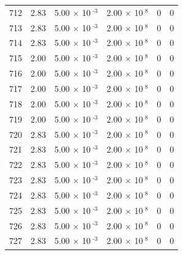 \documentclass[a4paper,11pt]{article}
\begin{document}
\begin{center}
\begin{longtable}{|R{1.5cm}|R{2.4cm}|R{2.4cm}|R{2.4cm}|R{2.4cm}|R{2.4cm}|}
  712 &   2.83  &         5.00 $\times$ 10$^{\text{          -3}}$  &         2.00 $\times$ 10$^{\text{           8}}$  & 0  & 0 \\
  713 &   2.83  &         5.00 $\times$ 10$^{\text{          -3}}$  &         2.00 $\times$ 10$^{\text{           8}}$  & 0  & 0 \\
  714 &   2.83  &         5.00 $\times$ 10$^{\text{          -3}}$  &         2.00 $\times$ 10$^{\text{           8}}$  & 0  & 0 \\
  715 &   2.00  &         5.00 $\times$ 10$^{\text{          -3}}$  &         2.00 $\times$ 10$^{\text{           8}}$  & 0  & 0 \\
  716 &   2.00  &         5.00 $\times$ 10$^{\text{          -3}}$  &         2.00 $\times$ 10$^{\text{           8}}$  & 0  & 0 \\
  717 &   2.00  &         5.00 $\times$ 10$^{\text{          -3}}$  &         2.00 $\times$ 10$^{\text{           8}}$  & 0  & 0 \\
  718 &   2.00  &         5.00 $\times$ 10$^{\text{          -3}}$  &         2.00 $\times$ 10$^{\text{           8}}$  & 0  & 0 \\
  719 &   2.00  &         5.00 $\times$ 10$^{\text{          -3}}$  &         2.00 $\times$ 10$^{\text{           8}}$  & 0  & 0 \\
  720 &   2.83  &         5.00 $\times$ 10$^{\text{          -3}}$  &         2.00 $\times$ 10$^{\text{           8}}$  & 0  & 0 \\
  721 &   2.83  &         5.00 $\times$ 10$^{\text{          -3}}$  &         2.00 $\times$ 10$^{\text{           8}}$  & 0  & 0 \\
  722 &   2.83  &         5.00 $\times$ 10$^{\text{          -3}}$  &         2.00 $\times$ 10$^{\text{           8}}$  & 0  & 0 \\
  723 &   2.83  &         5.00 $\times$ 10$^{\text{          -3}}$  &         2.00 $\times$ 10$^{\text{           8}}$  & 0  & 0 \\
  724 &   2.83  &         5.00 $\times$ 10$^{\text{          -3}}$  &         2.00 $\times$ 10$^{\text{           8}}$  & 0  & 0 \\
  725 &   2.83  &         5.00 $\times$ 10$^{\text{          -3}}$  &         2.00 $\times$ 10$^{\text{           8}}$  & 0  & 0 \\
  726 &   2.83  &         5.00 $\times$ 10$^{\text{          -3}}$  &         2.00 $\times$ 10$^{\text{           8}}$  & 0  & 0 \\
  727 &   2.83  &         5.00 $\times$ 10$^{\text{          -3}}$  &         2.00 $\times$ 10$^{\text{           8}}$  & 0  & 0 \\

\end{longtable}
\end{center}
\end{document}
